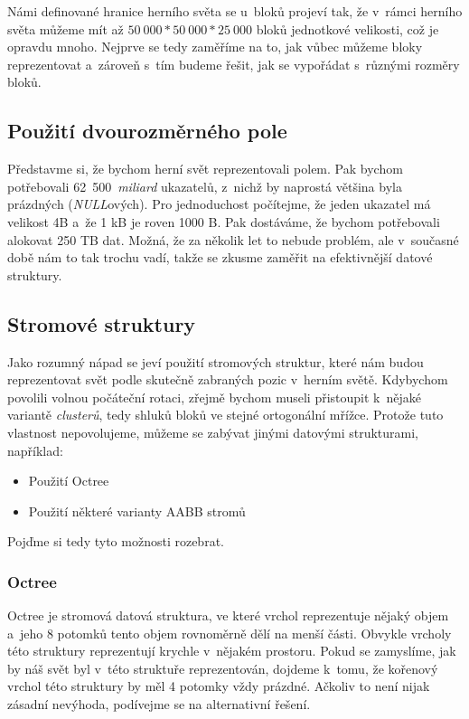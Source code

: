 Námi definované hranice herního světa se u~bloků projeví tak, že v~rámci herního světa můžeme mít až  $50~000 * 50~000 * 25~000$ bloků jednotkové velikosti, což je opravdu mnoho. Nejprve se tedy zaměříme na to, jak vůbec můžeme bloky reprezentovat a~zároveň s~tím budeme řešit, jak se vypořádat s~různými rozměry bloků.

\subsection{Použití dvourozměrného pole}

Představme si, že bychom herní svět reprezentovali polem. Pak bychom potřebovali 62~500~\textit{miliard} ukazatelů, z~nichž by naprostá většina byla prázdných (\textit{NULL}ových). Pro jednoduchost počítejme, že jeden ukazatel má velikost 4B a~že 1 kB je roven 1000 B. Pak dostáváme, že bychom potřebovali alokovat 250 TB dat. Možná, že za několik let to nebude problém, ale v~současné době nám to tak trochu vadí, takže se zkusme zaměřit na efektivnější datové struktury.

\subsection{Stromové struktury}
\label{subsec:trees}

Jako rozumný nápad se jeví použití stromových struktur, které nám budou reprezentovat svět podle skutečně zabraných pozic v~herním světě. Kdybychom povolili volnou počáteční rotaci, zřejmě bychom museli přistoupit k~nějaké variantě \textit{clusterů}, tedy shluků bloků ve stejné ortogonální mřížce. Protože tuto vlastnost nepovolujeme, můžeme se zabývat jinými datovými strukturami, například:

\begin{itemize}
	\item Použití Octree
	\item Použití některé varianty AABB stromů
\end{itemize}

Pojďme si tedy tyto možnosti rozebrat.

\subsubsection{Octree}
Octree je stromová datová struktura, ve které vrchol reprezentuje nějaký objem a~jeho 8 potomků tento objem rovnoměrně dělí na menší části. Obvykle vrcholy této struktury reprezentují krychle v~nějakém prostoru. Pokud se zamyslíme, jak by náš svět byl v~této struktuře reprezentován, dojdeme k~tomu, že kořenový vrchol této struktury by měl 4 potomky vždy prázdné. Ačkoliv to není nijak zásadní nevýhoda, podívejme se na alternativní řešení.

